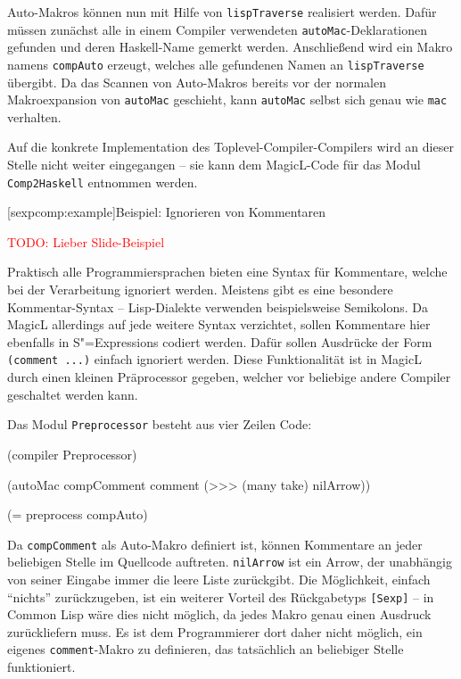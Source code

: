 \documentclass[12pt, a4paper, bibgerm]{scrbook}
\newenvironment{DIFnomarkup}{}{}
\newcommand\icode[1]{\lstinline?#1?}
\newcommand{\todo}[1]{
  \textcolor{red}{TODO: #1}
}
\newcommand\lsection{}
\newcommand{\sexps}{S"=Expressions}
\begin{document}
Auto-Makros können nun mit Hilfe von \icode{lispTraverse} realisiert
werden. Dafür müssen zunächst alle in einem Compiler verwendeten
\icode{autoMac}-Deklarationen gefunden und deren Haskell-Name gemerkt
werden. Anschließend wird ein Makro namens \icode{compAuto} erzeugt,
welches alle gefundenen Namen an \icode{lispTraverse}
übergibt. Da das Scannen von Auto-Makros bereits vor der
normalen Makroexpansion von \icode{autoMac} geschieht, kann
\icode{autoMac} selbst sich genau wie \icode{mac} verhalten.

Auf die konkrete Implementation des Toplevel-Compiler-Compilers wird an
dieser Stelle nicht weiter eingegangen -- sie kann dem MagicL-Code
für das Modul \icode{Comp2Haskell} entnommen werden.

\lsection[sexpcomp:example]{Beispiel: Ignorieren von Kommentaren}

\todo{Lieber Slide-Beispiel}

Praktisch alle Programmiersprachen bieten eine Syntax für Kommentare,
welche bei der Verarbeitung ignoriert werden. Meistens gibt es eine
besondere Kommentar-Syntax -- Lisp-Dialekte verwenden beispielsweise
Semikolons. Da MagicL allerdings auf jede weitere Syntax verzichtet,
sollen Kommentare hier ebenfalls in \sexps{} codiert werden. Dafür
sollen Ausdrücke der Form \icode{(comment ...)}  einfach ignoriert
werden. Diese Funktionalität ist in MagicL durch einen kleinen
{Präprocessor} gegeben, welcher vor beliebige andere Compiler geschaltet
werden kann.

Das Modul \icode{Preprocessor} besteht aus vier Zeilen Code:
\begin{DIFnomarkup}\begin{code}
(compiler Preprocessor)

(autoMac compComment comment
         (>>> (many take) nilArrow))

(= preprocess compAuto)  
\end{code}\end{DIFnomarkup}
Da \icode{compComment} als Auto-Makro definiert ist, können Kommentare
an jeder beliebigen Stelle im Quellcode auftreten. \icode{nilArrow} ist
ein Arrow, der unabhängig von seiner Eingabe immer die leere Liste
zurückgibt. Die Möglichkeit, einfach ``nichts'' zurückzugeben, ist ein
weiterer Vorteil des Rückgabetyps \icode{[Sexp]} -- in Common Lisp wäre
dies nicht möglich, da jedes Makro genau einen Ausdruck zurückliefern
muss. Es ist dem Programmierer dort daher nicht möglich, ein eigenes
\icode{comment}-Makro zu definieren, das tatsächlich an beliebiger
Stelle funktioniert.
\end{document}
